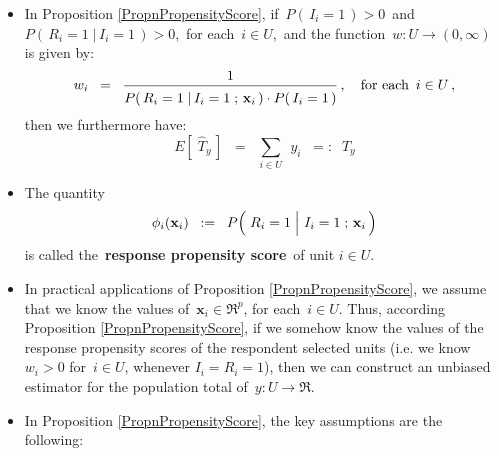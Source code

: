 \begin{remark}
\mbox{}\vskip 0.05cm
\begin{itemize}
\item
	In Proposition \ref{PropnPropensityScore},
	if \,$P(\,I_{i}=1\,) >0$\, and \,$P(\,R_{i}=1\;\vert\,I_{i}=1\,) > 0$,\,
	for each \,$i \in U$,\, and the function \,$w : U \longrightarrow (0,\infty)$\, is given by:
	\begin{equation*}
	w_{i}
	\;\; = \;\;
		\dfrac{1}{\overset{{\color{white}.}}{P}(\,R_{i}=1\;\vert\,I_{i}=1\;;\,\mathbf{x}_{i}\,)
		\cdot P(\,I_{i}=1\,)}\,,
	\quad
	\textnormal{for each \,$i \in U$}\,,
	\end{equation*}
	then we furthermore have:
	\begin{equation*}
	E\!\left[\;\widehat{T}_{y}\,\right]
	\;\; = \;\;
		\underset{i \in U}{\sum}\;\,y_{i}
	\;\; =: \;\;
		T_{y}
	\end{equation*}
\item
	The quantity
	\begin{equation*}
	\phi_{i}(\mathbf{x}_{i})
	\;\; := \;\;
		P\!\left(\,\left.R_{i}\overset{{\color{white}-}}{=}1\;\right\vert\,I_{i}=1\;;\,\mathbf{x}_{i}\,\right)
	\end{equation*}
	is called the \,\textbf{response propensity score}\, of unit $i \in U$.
\item
	In practical applications of Proposition \ref{PropnPropensityScore}, we assume
	that we know the values of \,$\mathbf{x}_{i} \in \Re^{p}$, for each \,$i \in U$.
	Thus, according Proposition \ref{PropnPropensityScore}, if we somehow
	know the values of the response propensity scores of the respondent selected units
	(i.e. we know \,$w_{i} > 0$ for \,$i \in U$, whenever $I_{i} = R_{i} = 1$),
	then we can construct an unbiased estimator for the population total of
	\,$y : U \longrightarrow \Re$.
\item
	In Proposition \ref{PropnPropensityScore}, the key assumptions are the following:
\end{itemize}
\end{remark}
